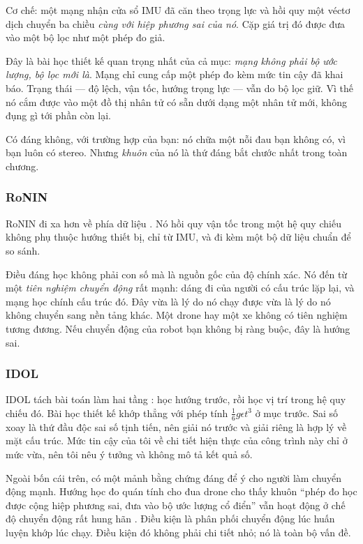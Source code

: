 \documentclass[../../deep_learning.tex]{subfiles}
\begin{document}
Cơ chế: một mạng nhận cửa sổ IMU đã căn theo trọng lực và hồi quy một véctơ dịch chuyển ba chiều \emph{cùng với hiệp phương sai của nó}. Cặp giá trị đó được đưa vào một bộ lọc như một phép đo giả.

Đây là bài học thiết kế quan trọng nhất của cả mục: \emph{mạng không phải bộ ước lượng, bộ lọc mới là}. Mạng chỉ cung cấp một phép đo kèm mức tin cậy đã khai báo. Trạng thái --- độ lệch, vận tốc, hướng trọng lực --- vẫn do bộ lọc giữ. Vì thế nó cắm được vào một đồ thị nhân tử có sẵn dưới dạng một nhân tử mới, không đụng gì tới phần còn lại.

Có đáng không, với trường hợp của bạn: nó chữa một nỗi đau bạn không có, vì bạn luôn có stereo. Nhưng \emph{khuôn} của nó là thứ đáng bắt chước nhất trong toàn chương.

\subsubsection{RoNIN}

RoNIN đi xa hơn về phía dữ liệu \cite{herath2020ronin}. Nó hồi quy vận tốc trong một hệ quy chiếu không phụ thuộc hướng thiết bị, chỉ từ IMU, và đi kèm một bộ dữ liệu chuẩn để so sánh.

Điều đáng học không phải con số mà là nguồn gốc của độ chính xác. Nó đến từ một \emph{tiên nghiệm chuyển động} rất mạnh: dáng đi của người có cấu trúc lặp lại, và mạng học chính cấu trúc đó. Đây vừa là lý do nó chạy được vừa là lý do nó không chuyển sang nền tảng khác. Một drone hay một xe không có tiên nghiệm tương đương. Nếu chuyển động của robot bạn không bị ràng buộc, đây là hướng sai.

\subsubsection{IDOL}

IDOL tách bài toán làm hai tầng \cite{sun2021idol}: học hướng trước, rồi học vị trí trong hệ quy chiếu đó. Bài học thiết kế khớp thẳng với phép tính \(\tfrac{1}{6}g\epsilon t^3\) ở mục trước. Sai số xoay là thứ đầu độc sai số tịnh tiến, nên giải nó trước và giải riêng là hợp lý về mặt cấu trúc. Mức tin cậy của tôi về chi tiết hiện thực của công trình này chỉ ở mức vừa, nên tôi nêu ý tưởng và không mô tả kết quả số.

Ngoài bốn cái trên, có một mảnh bằng chứng đáng để ý cho người làm chuyển động mạnh. Hướng học đo quán tính cho đua drone cho thấy khuôn ``phép đo học được cộng hiệp phương sai, đưa vào bộ ước lượng cổ điển'' vẫn hoạt động ở chế độ chuyển động rất hung hãn \cite{cioffi2023dronelio}. Điều kiện là phân phối chuyển động lúc huấn luyện khớp lúc chạy. Điều kiện đó không phải chi tiết nhỏ; nó là toàn bộ vấn đề.
\end{document}
